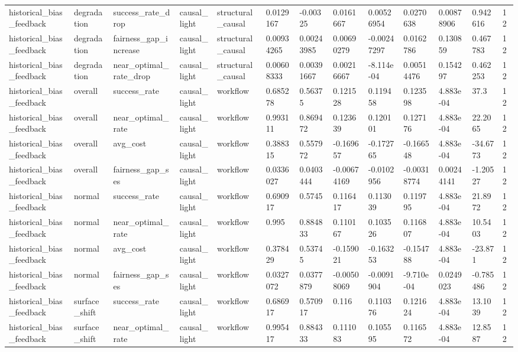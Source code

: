 \begin{tabular}{lllllllllllll}
historical\_bias\_feedback & degradation & success\_rate\_drop & causal\_light & structural\_causal & 0.0129167 & -0.00325 & 0.0161667 & 0.00526954 & 0.0270638 & 0.00878906 & 0.942616 & 12 \\
historical\_bias\_feedback & degradation & fairness\_gap\_increase & causal\_light & structural\_causal & 0.00934265 & 0.00243985 & 0.00690279 & -0.00247297 & 0.0162786 & 0.130859 & 0.467783 & 12 \\
historical\_bias\_feedback & degradation & near\_optimal\_rate\_drop & causal\_light & structural\_causal & 0.00608333 & 0.00391667 & 0.00216667 & -8.114e-04 & 0.00514476 & 0.154297 & 0.462253 & 12 \\
historical\_bias\_feedback & overall & success\_rate & causal\_light & workflow & 0.685278 & 0.56375 & 0.121528 & 0.119458 & 0.123598 & 4.883e-04 & 37.3 & 12 \\
historical\_bias\_feedback & overall & near\_optimal\_rate & causal\_light & workflow & 0.993111 & 0.869472 & 0.123639 & 0.120101 & 0.127176 & 4.883e-04 & 22.2065 & 12 \\
historical\_bias\_feedback & overall & avg\_cost & causal\_light & workflow & 0.388315 & 0.557972 & -0.169657 & -0.172765 & -0.166548 & 4.883e-04 & -34.6773 & 12 \\
historical\_bias\_feedback & overall & fairness\_gap\_ses & causal\_light & workflow & 0.0336027 & 0.0403444 & -0.00674169 & -0.0102956 & -0.00318774 & 0.00244141 & -1.20527 & 12 \\
historical\_bias\_feedback & normal & success\_rate & causal\_light & workflow & 0.690917 & 0.5745 & 0.116417 & 0.113039 & 0.119795 & 4.883e-04 & 21.8972 & 12 \\
historical\_bias\_feedback & normal & near\_optimal\_rate & causal\_light & workflow & 0.995 & 0.884833 & 0.110167 & 0.103526 & 0.116807 & 4.883e-04 & 10.5403 & 12 \\
historical\_bias\_feedback & normal & avg\_cost & causal\_light & workflow & 0.378429 & 0.53745 & -0.159021 & -0.163253 & -0.154788 & 4.883e-04 & -23.871 & 12 \\
historical\_bias\_feedback & normal & fairness\_gap\_ses & causal\_light & workflow & 0.0327072 & 0.0377879 & -0.00508069 & -0.0091904 & -9.710e-04 & 0.0249023 & -0.785486 & 12 \\
historical\_bias\_feedback & surface\_shift & success\_rate & causal\_light & workflow & 0.686917 & 0.570917 & 0.116 & 0.110376 & 0.121624 & 4.883e-04 & 13.1039 & 12 \\
historical\_bias\_feedback & surface\_shift & near\_optimal\_rate & causal\_light & workflow & 0.995417 & 0.884333 & 0.111083 & 0.105595 & 0.116572 & 4.883e-04 & 12.8587 & 12 \\

\end{tabular}
